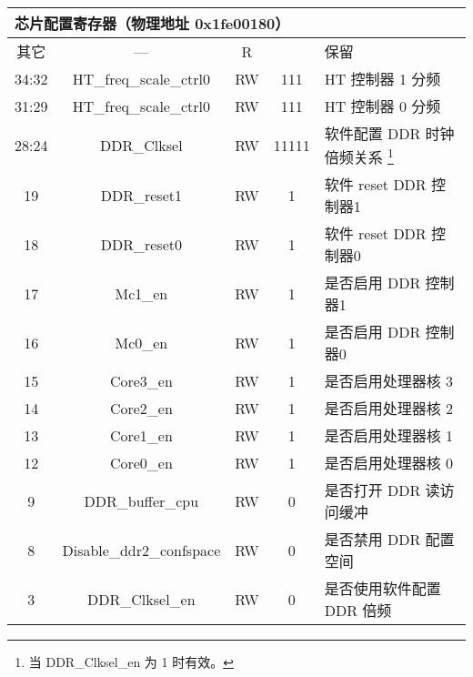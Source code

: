 \begin{longtable}{|c|c|c|c|p{6.5cm}|}
  \multicolumn{5}{|l|}{芯片配置寄存器（物理地址 0x1fe00180）} \\* \hline
    其它    & ---                      & R  &       & 保留                                                        \\ \hline
    34:32   & HT\_freq\_scale\_ctrl0   & RW & 111   & HT 控制器 1 分频                                            \\ \hline
    31:29   & HT\_freq\_scale\_ctrl0   & RW & 111   & HT 控制器 0 分频                                            \\ \hline
    28:24   & DDR\_Clksel              & RW & 11111 & 软件配置 DDR 时钟倍频关系
                                                      \footnote{当 DDR\_Clksel\_en 为 1 时有效。} \\ \hline
    19      & DDR\_reset1              & RW & 1     & 软件 reset DDR 控制器1                                      \\ \hline
    18      & DDR\_reset0              & RW & 1     & 软件 reset DDR 控制器0                                      \\ \hline
    17      & Mc1\_en                  & RW & 1     & 是否启用 DDR 控制器1                                        \\ \hline
    16      & Mc0\_en                  & RW & 1     & 是否启用 DDR 控制器0                                        \\ \hline
    15      & Core3\_en                & RW & 1     & 是否启用处理器核 3                                          \\ \hline
    14      & Core2\_en                & RW & 1     & 是否启用处理器核 2                                          \\ \hline
    13      & Core1\_en                & RW & 1     & 是否启用处理器核 1                                          \\ \hline
    12      & Core0\_en                & RW & 1     & 是否启用处理器核 0                                          \\ \hline
    9       & DDR\_buffer\_cpu         & RW & 0     & 是否打开 DDR 读访问缓冲                                     \\ \hline
    8       & Disable\_ddr2\_confspace & RW & 0     & 是否禁用 DDR 配置空间                                       \\ \hline
    3       & DDR\_Clksel\_en          & RW & 0     & 是否使用软件配置 DDR 倍频                                   \\ \hline

\end{longtable}
